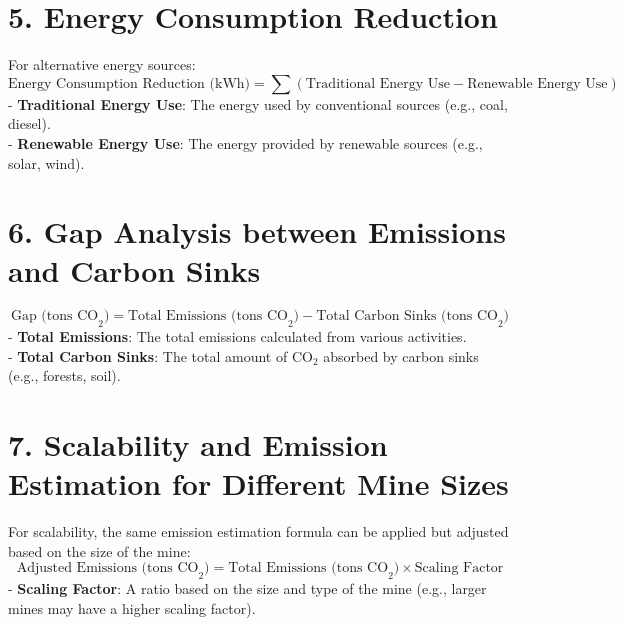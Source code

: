 \documentclass{article}
\begin{document}
\section*{5. Energy Consumption Reduction}
For alternative energy sources:
\[
\text{Energy Consumption Reduction (kWh)} = \sum (\text{Traditional Energy Use} - \text{Renewable Energy Use})
\]
- \textbf{Traditional Energy Use}: The energy used by conventional sources (e.g., coal, diesel). \\
- \textbf{Renewable Energy Use}: The energy provided by renewable sources (e.g., solar, wind).

\section*{6. Gap Analysis between Emissions and Carbon Sinks}
\[
\text{Gap (tons CO}_2\text{)} = \text{Total Emissions (tons CO}_2\text{)} - \text{Total Carbon Sinks (tons CO}_2\text{)}
\]
- \textbf{Total Emissions}: The total emissions calculated from various activities. \\
- \textbf{Total Carbon Sinks}: The total amount of CO$_2$ absorbed by carbon sinks (e.g., forests, soil).

\section*{7. Scalability and Emission Estimation for Different Mine Sizes}
For scalability, the same emission estimation formula can be applied but adjusted based on the size of the mine:
\[
\text{Adjusted Emissions (tons CO}_2\text{)} = \text{Total Emissions (tons CO}_2\text{)} \times \text{Scaling Factor}
\]
- \textbf{Scaling Factor}: A ratio based on the size and type of the mine (e.g., larger mines may have a higher scaling factor).
\end{document}
